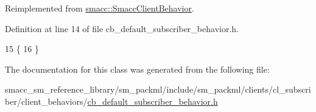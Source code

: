 Reimplemented from \hyperlink{classsmacc_1_1SmaccClientBehavior_a7962382f93987c720ad432fef55b123f}{smacc\+::\+Smacc\+Client\+Behavior}.



Definition at line 14 of file cb\+\_\+default\+\_\+subscriber\+\_\+behavior.\+h.


\begin{DoxyCode}
15     \{
16     \}
\end{DoxyCode}


The documentation for this class was generated from the following file\+:\begin{DoxyCompactItemize}
\item 
smacc\+\_\+sm\+\_\+reference\+\_\+library/sm\+\_\+packml/include/sm\+\_\+packml/clients/cl\+\_\+subscriber/client\+\_\+behaviors/\hyperlink{sm__packml_2include_2sm__packml_2clients_2cl__subscriber_2client__behaviors_2cb__default__subscriber__behavior_8h}{cb\+\_\+default\+\_\+subscriber\+\_\+behavior.\+h}\end{DoxyCompactItemize}
